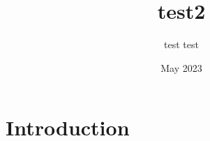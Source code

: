 \documentclass{article}
\title{test2}
\author{test test}
\date{May 2023}
\begin{document}
\maketitle

\section{Introduction}
\end{document}
